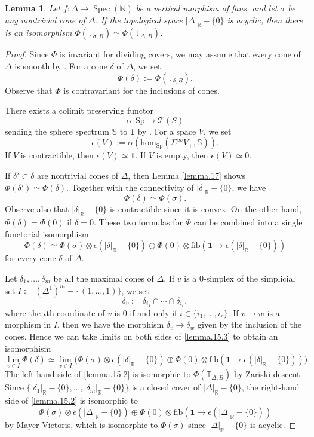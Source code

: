 \documentclass[10pt]{amsart}
\newtheorem{lem}[thm]{Lemma}
\theoremstyle{definition}
\theoremstyle{remark}
\numberwithin{equation}{subsection}
\newcommand{\N}{\mathbb{N}}
\newcommand{\R}{\mathbb{R}}
\newcommand{\T}{\mathbb{T}}
\newcommand{\sT}{\mathscr{T}}
\DeclareMathOperator{\Spec}{Spec}
\newcommand{\limit}{\mathop{\mathrm{lim}}}
\newcommand{\Spt}{\mathrm{Sp}}
\newcommand{\fib}{\mathrm{fib}}
\newcommand{\map}{\mathrm{hom}}
\newcommand{\unit}{\mathbf{1}}
\begin{document}
\begin{lem}
\label{lemma.15}
Let $f\colon \Delta\to \Spec(\N)$ be a vertical morphism of fans, and let $\sigma$ be any nontrivial cone of $\Delta$.
If the topological space $|\Delta|_{\R}-\{0\}$ is acyclic, then there is an isomorphism $\Phi(\T_{\sigma,B})\simeq \Phi(\T_{\Delta,B})$.
\end{lem}
\begin{proof}
Since $\Phi$ is invariant for dividing covers, we may assume that every cone of $\Delta$ is smooth by \cite[Theorem 11.1.9]{CLStoric}.
For a cone $\delta$ of $\Delta$, we set
\[
\Phi(\delta)
:=
\Phi(\T_{\delta,B}).
\]
Observe that $\Phi$ is contravariant for the inclusions of cones.

There exists a colimit preserving functor
\[
\alpha\colon \Spt \to \sT(S)
\]
sending the sphere spectrum $\mathbb{S}$ to $\unit$ by \cite[Corollary 1.4.4.6]{HA}.
For a space $V$, we set
\[
\epsilon(V)
:=
\alpha(\map_{\Spt}(\Sigma^\infty V_+,\mathbb{S})).
\]
If $V$ is contractible, then $\epsilon(V)\simeq \unit$.
If $V$ is empty, then $\epsilon(V)\simeq 0$.

If $\delta'\subset \delta$ are nontrivial cones of $\Delta$, then Lemma \ref{lemma.17} shows $\Phi(\delta')\simeq \Phi(\delta)$.
Together with the connectivity of $|\delta|_{\R}-\{0\}$, we have
\[
\Phi(\delta)\simeq \Phi(\sigma).
\]
Observe also that $|\delta|_{\R}-\{0\}$ is contractible since it is convex.
On the other hand, $\Phi(\delta)=\Phi(0)$ if $\delta=0$.
These two formulas for $\Phi$ can be combined into a single functorial isomorphism
\begin{equation}
\label{lemma.15.3}
\Phi(\delta)
\simeq
\Phi(\sigma)\otimes \epsilon(|\delta|_{\R}-\{0\})
\oplus
\Phi(0)\otimes \fib(\unit \to \epsilon(|\delta|_{\R}-\{0\}))
\end{equation}
for every cone $\delta$ of $\Delta$.

Let $\delta_1,\ldots,\delta_m$ be all the maximal cones of $\Delta$.
If $v$ is a $0$-simplex of the simplicial set $I:=(\Delta^1)^m-\{(1,\ldots,1)\}$, we set
\[
\delta_v:=\delta_{i_1}\cap \cdots \cap \delta_{i_r},
\]
where the $i$th coordinate of $v$ is $0$ if and only if $i\in \{i_1,\ldots,i_r\}$.
If $v\to w$ is a morphism in $I$, then we have the morphism $\delta_v\to \delta_w$ given by the inclusion of the cones.
Hence we can take limits on both sides of \eqref{lemma.15.3} to obtain an isomorphism
\begin{equation}
\label{lemma.15.2}
\limit_{v\in I} \Phi(\delta)
\simeq
\limit_{v\in I}
\big(
\Phi(\sigma)\otimes \epsilon(|\delta|_{\R}-\{0\})
\oplus
\Phi(0)\otimes \fib(\unit \to \epsilon(|\delta|_{\R}-\{0\}))
\big).
\end{equation}
The left-hand side of \eqref{lemma.15.2} is isomorphic to $\Phi(\T_{\Delta,B})$ by Zariski descent.
Since $\{|\delta_1|_{\R}-\{0\},\ldots,|\delta_m|_{\R}-\{0\}\}$ is a closed cover of $|\Delta|_{\R}-\{0\}$, the right-hand side of \eqref{lemma.15.2} is isomorphic to
\[
\Phi(\sigma)\otimes \epsilon(|\Delta|_{\R}-\{0\})
\oplus
\Phi(0)\otimes \fib(\unit \to \epsilon(|\Delta|_{\R}-\{0\}))
\]
by Mayer-Vietoris, which is isomorphic to $\Phi(\sigma)$ since $|\Delta|_{\R}-\{0\}$ is acyclic.
\end{proof}
\end{document}
